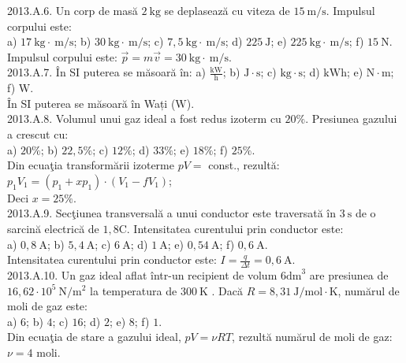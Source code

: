 2013.A.6. Un corp de masă $2 \mathrm{~kg}$ se deplasează cu viteza de $15 \mathrm{~m} / \mathrm{s}$. Impulsul corpului este:\\ a) $17 \mathrm{~kg} \cdot \mathrm{~m} / \mathrm{s}$; b) $30 \mathrm{~kg} \cdot \mathrm{~m} / \mathrm{s}$; c) $7,5 \mathrm{~kg} \cdot \mathrm{~m} / \mathrm{s}$; d) $225 \mathrm{~J}$; e) $225 \mathrm{~kg} \cdot \mathrm{~m} / \mathrm{s}$; f) $15 \mathrm{~N}$.\\ Impulsul corpului este: $\vec{p}=m \vec{v}=30 \mathrm{~kg} \cdot \mathrm{~m} / \mathrm{s}$.\\

2013.A.7. În SI puterea se măsoară în: a) $\frac{\mathrm{kW}}{\mathrm{h}}$; b) $\mathrm{J} \cdot \mathrm{s}$; c) $\mathrm{kg} \cdot \mathrm{s}$; d) $\mathrm{kWh}$; e) $\mathrm{N} \cdot \mathrm{m}$; f) $\mathrm{W}$.\\ În SI puterea se măsoară în Wați ($\mathrm{W}$).\\

2013.A.8. Volumul unui gaz ideal a fost redus izoterm cu $20 \%$. Presiunea gazului a crescut cu:\\ a) $20 \%$; b) $22,5 \%$; c) $12 \%$; d) $33 \%$; e) $18 \%$; f) $25 \%$.\\ Din ecuaţia transformării izoterme $p V=$ const., rezultă:\\ $p_{1} V_{1}=\left(p_{1}+x p_{1}\right) \cdot\left(V_{1}-f V_{1}\right)$;\\ Deci $x=25 \%$.\\

2013.A.9. Secţiunea transversală a unui conductor este traversată în $3 \mathrm{~s}$ de o sarcină electrică de $1,8 \mathrm{C}$. Intensitatea curentului prin conductor este:\\ a) $0,8 \mathrm{~A}$; b) $5,4 \mathrm{~A}$; c) $6 \mathrm{~A}$; d) $1 \mathrm{~A}$; e) $0,54 \mathrm{~A}$; f) $0,6 \mathrm{~A}$.\\ Intensitatea curentului prin conductor este: $I=\frac{q}{\Delta t}=0,6 \mathrm{~A}$.\\

2013.A.10. Un gaz ideal aflat într-un recipient de volum $6 \mathrm{dm}^{3}$ are presiunea de $16,62 \cdot 10^{5} \mathrm{~N} / \mathrm{m}^{2}$ la temperatura de $300 \mathrm{~K}$ . Dacă $R=8,31 \mathrm{~J} / \mathrm{mol} \cdot \mathrm{K}$, numărul de moli de gaz este:\\ a) $6$; b) $4$; c) $16$; d) $2$; e) $8$; f) $1$.\\ Din ecuaţia de stare a gazului ideal, $p V=\nu R T$, rezultă numărul de moli de gaz: $\nu=4$ moli.\\

